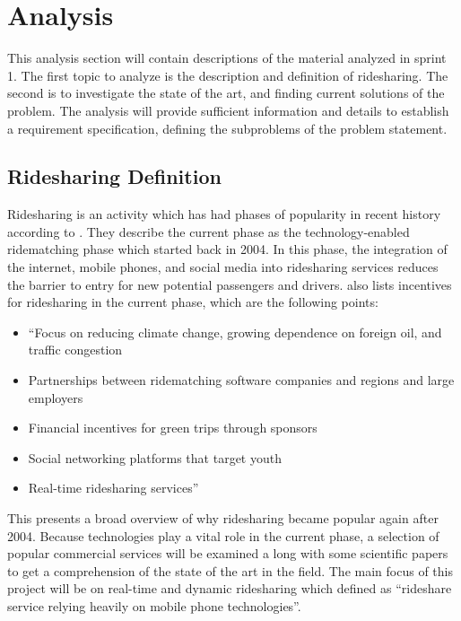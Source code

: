 \section{Analysis}\label{s:s1anal}
This analysis section will contain descriptions of the material analyzed in sprint 1.
The first topic to analyze is the description and definition of ridesharing.
The second is to investigate the state of the art, and finding current solutions of the problem.
The analysis will provide sufficient information and details to establish a requirement specification, defining the subproblems of the problem statement. 

\subsection{Ridesharing Definition}
Ridesharing is an activity which has had phases of popularity in recent history according to \citet{doi:10.1080/01441647.2011.621557}.
They describe the current phase as the technology-enabled ridematching phase which started back in 2004.
In this phase, the integration of the internet, mobile phones, and social media into ridesharing services reduces the barrier to entry for new potential passengers and drivers.
\citet{doi:10.1080/01441647.2011.621557} also lists incentives for ridesharing in the current phase, which are the following points:

\begin{itemize}
	\item ``Focus on reducing climate change, growing dependence on foreign oil, and traffic congestion
	\item Partnerships between ridematching software companies and regions and large employers
	\item Financial incentives for green trips through sponsors
	\item Social networking platforms that target youth
	\item Real-time ridesharing services''
\end{itemize}

This presents a broad overview of why ridesharing became popular again after 2004.
Because technologies play a vital role in the current phase, a selection of popular commercial services will be examined a	long with some scientific papers to get a comprehension of the state of the art in the field.
The main focus of this project will be on real-time and dynamic ridesharing which \citet{amey2011real} defined as ``rideshare service relying heavily on mobile phone technologies''.

